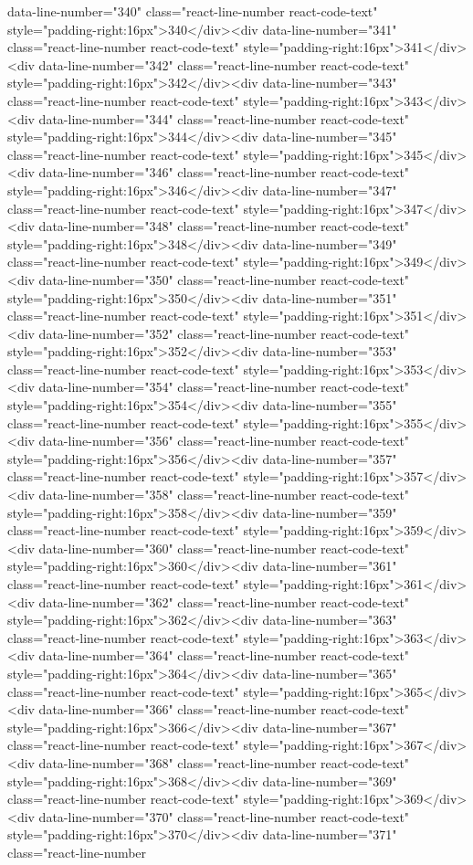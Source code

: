 data-line-number="340" class="react-line-number react-code-text" style="padding-right:16px">340</div><div data-line-number="341" class="react-line-number react-code-text" style="padding-right:16px">341</div><div data-line-number="342" class="react-line-number react-code-text" style="padding-right:16px">342</div><div data-line-number="343" class="react-line-number react-code-text" style="padding-right:16px">343</div><div data-line-number="344" class="react-line-number react-code-text" style="padding-right:16px">344</div><div data-line-number="345" class="react-line-number react-code-text" style="padding-right:16px">345</div><div data-line-number="346" class="react-line-number react-code-text" style="padding-right:16px">346</div><div data-line-number="347" class="react-line-number react-code-text" style="padding-right:16px">347</div><div data-line-number="348" class="react-line-number react-code-text" style="padding-right:16px">348</div><div data-line-number="349" class="react-line-number react-code-text" style="padding-right:16px">349</div><div data-line-number="350" class="react-line-number react-code-text" style="padding-right:16px">350</div><div data-line-number="351" class="react-line-number react-code-text" style="padding-right:16px">351</div><div data-line-number="352" class="react-line-number react-code-text" style="padding-right:16px">352</div><div data-line-number="353" class="react-line-number react-code-text" style="padding-right:16px">353</div><div data-line-number="354" class="react-line-number react-code-text" style="padding-right:16px">354</div><div data-line-number="355" class="react-line-number react-code-text" style="padding-right:16px">355</div><div data-line-number="356" class="react-line-number react-code-text" style="padding-right:16px">356</div><div data-line-number="357" class="react-line-number react-code-text" style="padding-right:16px">357</div><div data-line-number="358" class="react-line-number react-code-text" style="padding-right:16px">358</div><div data-line-number="359" class="react-line-number react-code-text" style="padding-right:16px">359</div><div data-line-number="360" class="react-line-number react-code-text" style="padding-right:16px">360</div><div data-line-number="361" class="react-line-number react-code-text" style="padding-right:16px">361</div><div data-line-number="362" class="react-line-number react-code-text" style="padding-right:16px">362</div><div data-line-number="363" class="react-line-number react-code-text" style="padding-right:16px">363</div><div data-line-number="364" class="react-line-number react-code-text" style="padding-right:16px">364</div><div data-line-number="365" class="react-line-number react-code-text" style="padding-right:16px">365</div><div data-line-number="366" class="react-line-number react-code-text" style="padding-right:16px">366</div><div data-line-number="367" class="react-line-number react-code-text" style="padding-right:16px">367</div><div data-line-number="368" class="react-line-number react-code-text" style="padding-right:16px">368</div><div data-line-number="369" class="react-line-number react-code-text" style="padding-right:16px">369</div><div data-line-number="370" class="react-line-number react-code-text" style="padding-right:16px">370</div><div data-line-number="371" class="react-line-number 